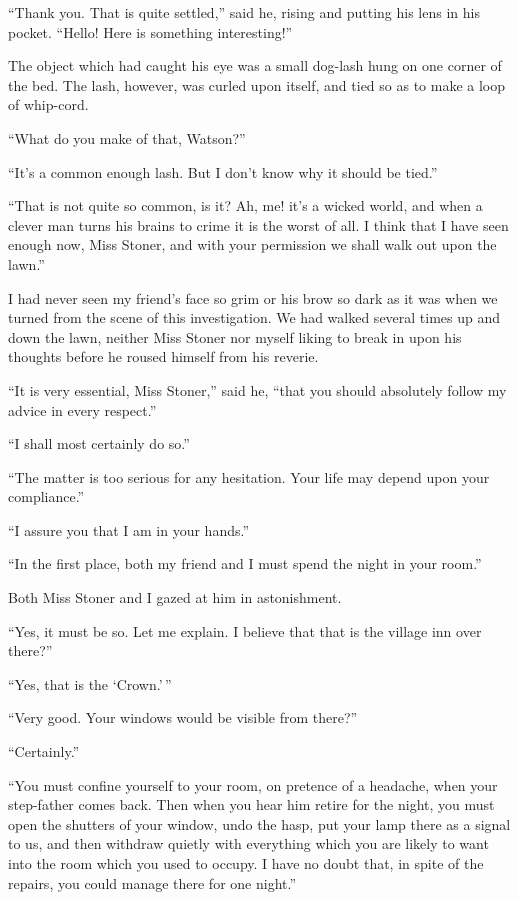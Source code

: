 “Thank you. That is quite settled,” said he, rising and
putting his lens in his pocket. “Hello! Here is something
interesting!”

The object which had caught his eye was a small dog-lash
hung on one corner of the bed. The lash, however, was curled
upon itself, and tied so as to make a loop of whip-cord.

“What do you make of that, Watson?”

“It’s a common enough lash. But I don’t know why it
should be tied.”

“That is not quite so common, is it? Ah, me! it’s a wicked
world, and when a clever man turns his brains to crime it is
the worst of all. I think that I have seen enough now, Miss
Stoner, and with your permission we shall walk out upon the
lawn.”

I had never seen my friend’s face so grim or his brow so
dark as it was when we turned from the scene of this investigation.
We had walked several times up and down the lawn,
neither Miss Stoner nor myself liking to break in upon his
thoughts before he roused himself from his reverie.

“It is very essential, Miss Stoner,” said he, “that you
should absolutely follow my advice in every respect.”

“I shall most certainly do so.”

“The matter is too serious for any hesitation. Your life
may depend upon your compliance.”

“I assure you that I am in your hands.”

“In the first place, both my friend and I must spend the
night in your room.”

Both Miss Stoner and I gazed at him in astonishment.

“Yes, it must be so. Let me explain. I believe that that
is the village inn over there?”

“Yes, that is the ‘Crown.’\,”

“Very good. Your windows would be visible from there?”

“Certainly.”

“You must confine yourself to your room, on pretence of a
headache, when your step-father comes back. Then when you
hear him retire for the night, you must open the shutters of
your window, undo the hasp, put your lamp there as a signal
to us, and then withdraw quietly with everything which you
are likely to want into the room which you used to occupy.
I have no doubt that, in spite of the repairs, you could manage
there for one night.”


